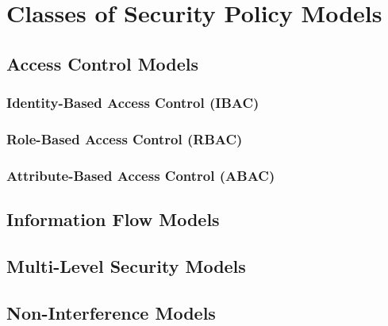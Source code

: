 \section{Classes of Security Policy Models}
\label{sec:securitypolicymodels}

\subsection{Access Control Models}
\subsubsection{Identity-Based Access Control (IBAC)}
\subsubsection{Role-Based Access Control (RBAC)}
\subsubsection{Attribute-Based Access Control (ABAC)}

\subsection{Information Flow Models}

\subsection{Multi-Level Security Models}

\subsection{Non-Interference Models}
